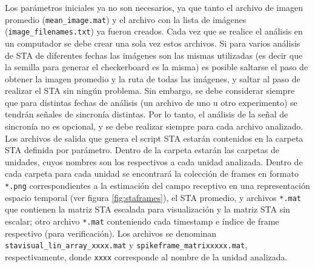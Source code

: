\documentclass[10pt]{article}
\begin{document}
Los parámetros iniciales ya no son necesarios, ya que tanto el archivo de imagen promedio (\verb+mean_image.mat+) y el archivo con la lista de imágenes (\verb+image_filenames.txt+) ya fueron creados.
Cada vez que se realice el análisis en un computador se debe crear una sola vez estos archivos. Si para varios análisis de STA de diferentes fechas las imágenes son las mismas utilizadas (es decir que la semilla para generar el checkerboard es la misma) es posible saltarse el paso de obtener la imagen promedio y la ruta de todas las imágenes, y saltar al paso de realizar el STA sin ningún problema. Sin embargo, se debe considerar siempre que para distintas fechas de análisis (un archivo de uno u otro experimento) se tendrán señales de sincronía distintas. Por lo tanto, el análisis de la señal de sincronía no es opcional, y se debe realizar siempre para cada archivo analizado.\\

Los archivos de salida que genera el script STA estarán contenidos en la carpeta STA definida por parámetro. Dentro de la carpeta estarán las carpetas de unidades, cuyos nombres son los respectivos a cada unidad analizada. Dentro de cada carpeta para cada unidad se encontrará la colección de frames en formato \verb+*.png+ correspondientes a la estimación del campo receptivo en una representación espacio temporal (ver figura \ref{fig:staframes}), el STA promedio, y archivos \verb+*.mat+ que contienen la matriz STA escalada para visualización y la matriz STA sin escalar; otro archivo \verb+*.mat+ conteniendo cada timestamp e índice de frame respectivo (para verificación). Los archivos se denominan \verb+stavisual_lin_array_xxxx.mat+ y \verb+spikeframe_matrixxxxx.mat+, respectivamente, donde \verb+xxxx+ corresponde al nombre de la unidad analizada.\\
\end{document}
